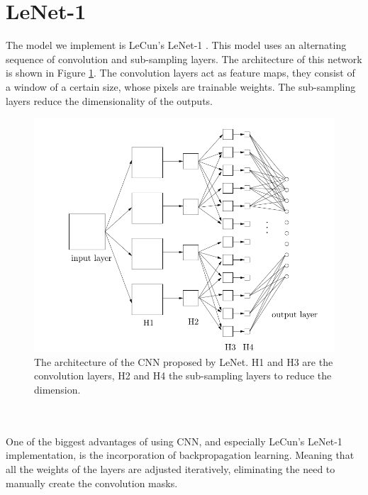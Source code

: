 \documentclass[a4paper,onecolumn]{report}
\begin{document}
\section{LeNet-1}
The model we implement is LeCun's LeNet-1 \cite{lenet}. This model uses an alternating sequence of convolution and sub-sampling layers. The architecture of this network is shown in Figure \ref{fig:Architecture}. The convolution layers act as feature maps, they consist of a window of a certain size, whose pixels are trainable weights. The sub-sampling layers reduce the dimensionality of the outputs. 
\begin{figure}[h!]
    \centering
    \includegraphics[scale=0.4]{./images/Architecture_CNN.png}
    \caption{The architecture of the CNN proposed by LeNet. H1 and H3 are the convolution layers, H2 and H4 the sub-sampling layers to reduce the dimension. }
	\label{fig:Architecture}
\end{figure}
\\\\
One of the biggest advantages of using CNN, and especially LeCun's LeNet-1 implementation, is the incorporation of backpropagation learning. Meaning that all the weights of the layers are adjusted iteratively, eliminating the need to manually create the convolution masks.
\\
\end{document}
